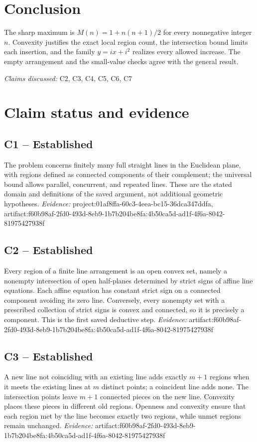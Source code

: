 \documentclass[11pt]{article}
\begin{document}
\section{Conclusion}
The sharp maximum is $M(n)=1+n(n+1)/2$ for every nonnegative integer $n$. Convexity justifies the exact local region count, the intersection bound limits each insertion, and the family $y=ix+i^2$ realizes every allowed increase. The empty arrangement and the small-value checks agree with the general result.

\textit{Claims discussed: }C2, C3, C4, C5, C6, C7
\section*{Claim status and evidence}
\subsection{C1 -- Established}
The problem concerns finitely many full straight lines in the Euclidean plane, with regions defined as connected components of their complement; the universal bound allows parallel, concurrent, and repeated lines.
These are the stated domain and definitions of the saved argument, not additional geometric hypotheses.
\textit{Evidence: }project:01af8ffa-60c3-4eea-bc15-36dca347ddfa, artifact:f60b98af-2fd0-493d-8eb9-1b7b204be8fa:4b50ca5d-ad1f-4f6a-8042-81975427938f
\subsection{C2 -- Established}
Every region of a finite line arrangement is an open convex set, namely a nonempty intersection of open half-planes determined by strict signs of affine line equations.
Each affine equation has constant strict sign on a connected component avoiding its zero line. Conversely, every nonempty set with a prescribed collection of strict signs is convex and connected, so it is precisely a component. This is the first saved deductive step.
\textit{Evidence: }artifact:f60b98af-2fd0-493d-8eb9-1b7b204be8fa:4b50ca5d-ad1f-4f6a-8042-81975427938f
\subsection{C3 -- Established}
A new line not coinciding with an existing line adds exactly $m+1$ regions when it meets the existing lines at $m$ distinct points; a coincident line adds none.
The intersection points leave $m+1$ connected pieces on the new line. Convexity places these pieces in different old regions. Openness and convexity ensure that each region met by the line becomes exactly two regions, while unmet regions remain unchanged.
\textit{Evidence: }artifact:f60b98af-2fd0-493d-8eb9-1b7b204be8fa:4b50ca5d-ad1f-4f6a-8042-81975427938f
\end{document}
